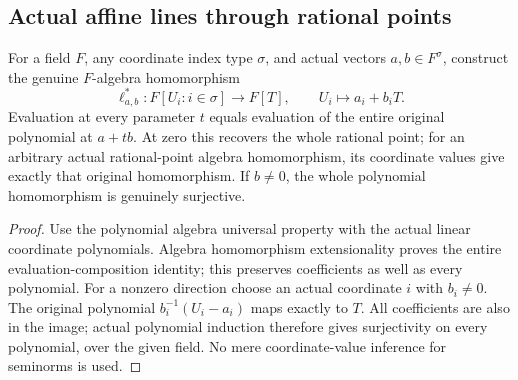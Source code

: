 \subsection{Actual affine lines through rational points}
\label{subsec:actual-affine-lines}

\begin{definition}
\label{algebra:affine-line-substitution}
\leanok
For a field $F$, any coordinate index type $\sigma$, and actual vectors
$a,b\in F^\sigma$, construct the genuine $F$-algebra homomorphism
\[
 \ell_{a,b}^*:F[U_i:i\in\sigma]\longrightarrow F[T],
 \qquad U_i\longmapsto a_i+b_iT.
\]
Evaluation at every parameter $t$ equals evaluation of the entire original
polynomial at $a+tb$. At zero this recovers the whole rational point;
for an arbitrary actual rational-point algebra homomorphism, its coordinate
values give exactly that original homomorphism. If $b\ne0$, the whole
polynomial homomorphism is genuinely surjective.
\end{definition}
\begin{proof}
Use the polynomial algebra universal property with the actual linear
coordinate polynomials. Algebra homomorphism extensionality proves the
entire evaluation-composition identity; this preserves coefficients as
well as every polynomial. For a nonzero direction choose an actual
coordinate $i$ with $b_i\ne0$. The original polynomial
$b_i^{-1}(U_i-a_i)$ maps exactly to $T$. All coefficients are also in the
image; actual polynomial induction therefore gives surjectivity on every
polynomial, over the given field. No mere coordinate-value
inference for seminorms is used.
\end{proof}

